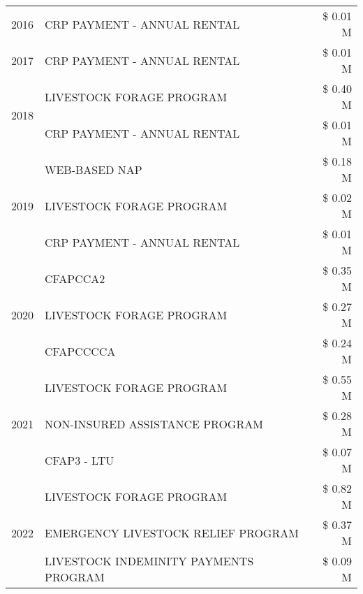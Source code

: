 \begin{tabular}{llr}
\cline{1-3}
2016 & CRP PAYMENT - ANNUAL RENTAL & \$ 0.01 M \\
\cline{1-3}
2017 & CRP PAYMENT - ANNUAL RENTAL & \$ 0.01 M \\
\cline{1-3}
\multirow[t]{2}{*}{2018} & LIVESTOCK FORAGE PROGRAM & \$ 0.40 M \\
 & CRP PAYMENT - ANNUAL RENTAL & \$ 0.01 M \\
\cline{1-3}
\multirow[t]{3}{*}{2019} & WEB-BASED NAP & \$ 0.18 M \\
 & LIVESTOCK FORAGE PROGRAM & \$ 0.02 M \\
 & CRP PAYMENT - ANNUAL RENTAL & \$ 0.01 M \\
\cline{1-3}
\multirow[t]{3}{*}{2020} & CFAPCCA2 & \$ 0.35 M \\
 & LIVESTOCK FORAGE PROGRAM & \$ 0.27 M \\
 & CFAPCCCCA & \$ 0.24 M \\
\cline{1-3}
\multirow[t]{3}{*}{2021} & LIVESTOCK FORAGE PROGRAM & \$ 0.55 M \\
 & NON-INSURED ASSISTANCE PROGRAM & \$ 0.28 M \\
 & CFAP3 - LTU & \$ 0.07 M \\
\cline{1-3}
\multirow[t]{3}{*}{2022} & LIVESTOCK FORAGE PROGRAM & \$ 0.82 M \\
 & EMERGENCY LIVESTOCK RELIEF PROGRAM & \$ 0.37 M \\
 & LIVESTOCK INDEMINITY PAYMENTS PROGRAM & \$ 0.09 M \\
\cline{1-3}
\bottomrule
\end{tabular}
